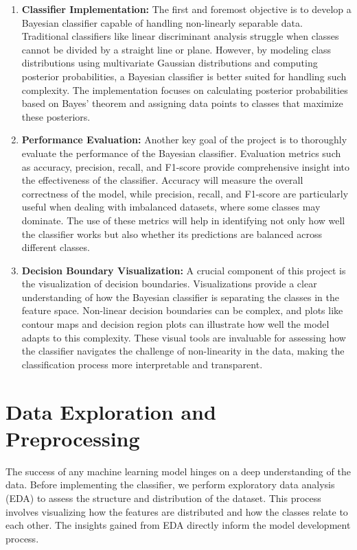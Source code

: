 \documentclass[conference]{IEEEtran}
\begin{document}
\begin{enumerate}
	\item \textbf{Classifier Implementation:} The first and foremost objective is to develop a Bayesian classifier capable of handling non-linearly separable data. Traditional classifiers like linear discriminant analysis struggle when classes cannot be divided by a straight line or plane. However, by modeling class distributions using multivariate Gaussian distributions and computing posterior probabilities, a Bayesian classifier is better suited for handling such complexity. The implementation focuses on calculating posterior probabilities based on Bayes' theorem and assigning data points to classes that maximize these posteriors.
	
	\item \textbf{Performance Evaluation:} Another key goal of the project is to thoroughly evaluate the performance of the Bayesian classifier. Evaluation metrics such as accuracy, precision, recall, and F1-score provide comprehensive insight into the effectiveness of the classifier. Accuracy will measure the overall correctness of the model, while precision, recall, and F1-score are particularly useful when dealing with imbalanced datasets, where some classes may dominate. The use of these metrics will help in identifying not only how well the classifier works but also whether its predictions are balanced across different classes.
	
	\item \textbf{Decision Boundary Visualization:} A crucial component of this project is the visualization of decision boundaries. Visualizations provide a clear understanding of how the Bayesian classifier is separating the classes in the feature space. Non-linear decision boundaries can be complex, and plots like contour maps and decision region plots can illustrate how well the model adapts to this complexity. These visual tools are invaluable for assessing how the classifier navigates the challenge of non-linearity in the data, making the classification process more interpretable and transparent.
\end{enumerate}

\section{Data Exploration and Preprocessing}

The success of any machine learning model hinges on a deep understanding of the data. Before implementing the classifier, we perform exploratory data analysis (EDA) to assess the structure and distribution of the dataset. This process involves visualizing how the features are distributed and how the classes relate to each other. The insights gained from EDA directly inform the model development process.
\end{document}
